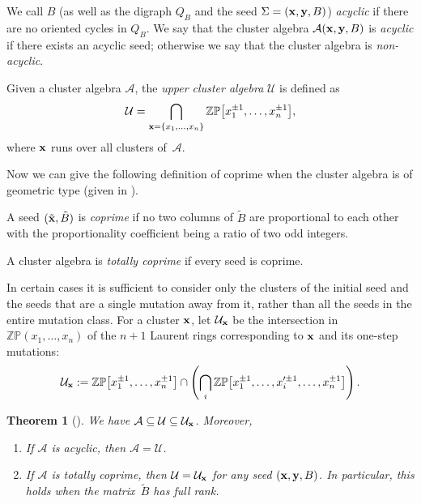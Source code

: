 \documentclass[11pt]{article}
\numberwithin{equation}{section}
\newtheorem{Theorem}{Theorem}[section]
\begin{document}
 We call $B$ (as well as the digraph $Q_B$ and the seed $\Sigma=({\bf x},{\bf y},B)$) \emph{acyclic} if there are no oriented cycles in $Q_B$.
We say that the cluster algebra $\mathcal{A}({\bf x},{\bf y},B)$ is \emph{acyclic} if there exists an acyclic seed; otherwise we say that the cluster algebra is \emph{non-acyclic}.

\begin{Definition}
Given a cluster algebra $\mathcal{A}$, the \emph{upper cluster algebra} $\mathcal{U}$ is def\/ined as
\begin{gather*}
 \mathcal{U} =
 \bigcap_{{\bf x}=\{x_1,\ldots,x_n\}}
  \mathbb{ZP}\big[x_1^{\pm 1},\ldots,x_n^{\pm 1}\big],
\end{gather*}
where ${\bf x}$ runs over all clusters of~$\mathcal{A}$.
\end{Definition}

Now we can give the following def\/inition of coprime when the cluster algebra is of geometric type (given in \cite[Lemma~3.1]{BFZ}).

\begin{Definition}
A seed  $(\tilde{\bf x},\tilde{B})$ is \emph{coprime} if no two columns of $\tilde{B}$ are proportional to each other with the proportionality coef\/f\/icient being a ratio of two odd integers.

A cluster algebra is \emph{totally coprime} if every seed is coprime.
\end{Definition}


In certain cases it is suf\/f\/icient to consider only the clusters of the initial seed and the seeds that are a single mutation away from it, rather than all the seeds in the entire mutation class.
For a cluster ${\bf x}$,  let $\mathcal{U}_{{\bf x}}$ be the intersection in $\mathbb{ZP}(x_1,\ldots,x_n)$ of the $n+1$ Laurent rings corresponding to ${\bf x}$ and its one-step mutations:
\begin{gather*}
\mathcal{U}_{\bf x} := \mathbb{ZP}\big[x_1^{\pm 1},\ldots, x_n^{\pm 1}\big] \cap \left(\bigcap_i \mathbb{ZP}\big[x_1^{\pm 1},\ldots,x_i'^{\pm 1},\ldots, x_n^{\pm 1}\big]\right).
\end{gather*}

\begin{Theorem}[\cite{BFZ,M}]\label{UB}
We have
 $\mathcal{A}\subseteq\mathcal{U}\subseteq\mathcal{U}_{\bf x}$. Moreover,
\begin{enumerate}\itemsep=0pt
\item[$(i)$] If $\mathcal{A}$ is acyclic, then $\mathcal{A}=\mathcal{U}$.

\item[$(ii)$] If $\mathcal{A}$ is totally coprime, then $\mathcal{U}=\mathcal{U}_{{\bf x}}$ for any seed $({\bf x},{\bf y},B)$. In particular, this holds when the matrix~$\tilde{B}$ has full rank.
\end{enumerate}
\end{Theorem}
\end{document}
